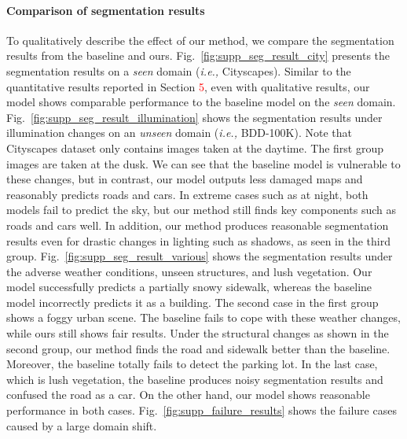 \documentclass[final]{latex/cvpr}
\newcommand{\todow}[1]{\textcolor{red}{#1}}
\begin{document}
\paragraph{Comparison of segmentation results}
\vspace*{-0.3cm}
To qualitatively describe the effect of our method, we compare the segmentation results from the baseline and ours.
Fig.~\ref{fig:supp_seg_result_city} presents the segmentation results on a \emph{seen} domain (\textit{i.e.,} Cityscapes).
Similar to the quantitative results reported in Section \todow{5}, even with qualitative results, our model shows comparable performance to the baseline model on the \emph{seen} domain.
Fig.~\ref{fig:supp_seg_result_illumination} shows the segmentation results under illumination changes on an \emph{unseen} domain (\textit{i.e.,} BDD-100K). 
Note that Cityscapes dataset only contains images taken at the daytime. 
The first group images are taken at the dusk.
We can see that the baseline model is vulnerable to these changes, but in contrast, our model outputs less damaged maps and reasonably predicts roads and cars.
In extreme cases such as at night, both models fail to predict the sky, but our method still finds key components such as roads and cars well. 
In addition, our method produces reasonable segmentation results even for drastic changes in lighting such as shadows, as seen in the third group.
Fig.~\ref{fig:supp_seg_result_various} shows the segmentation results under the adverse weather conditions, unseen structures, and lush vegetation.
Our model successfully predicts a partially snowy sidewalk, whereas the baseline model incorrectly predicts it as a building.
The second case in the first group shows a foggy urban scene. The baseline fails to cope with these weather changes, while ours still shows fair results. Under the structural changes as shown in the second group, our method finds the road and sidewalk better than the baseline. Moreover, the baseline totally fails to detect the parking lot. In the last case, which is lush vegetation, the baseline produces noisy segmentation results and confused the road as a car. On the other hand, our model shows reasonable performance in both cases. Fig.~\ref{fig:supp_failure_results} shows the failure cases caused by a large domain shift.


\vspace*{-0.4cm}
\end{document}
